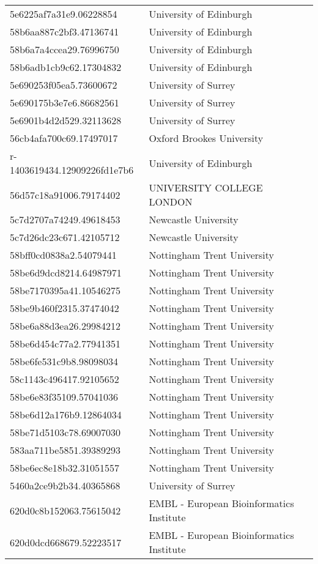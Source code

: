 \begin{tabular}{ll}
5e6225af7a31e9.06228854 & University of Edinburgh \\
58b6aa887c2bf3.47136741 & University of Edinburgh \\
58b6a7a4ccea29.76996750 & University of Edinburgh \\
58b6adb1cb9c62.17304832 & University of Edinburgh \\
5e690253f05ea5.73600672 & University of Surrey \\
5e690175b3e7e6.86682561 & University of Surrey \\
5e6901b4d2d529.32113628 & University of Surrey \\
56cb4afa700c69.17497017 & Oxford Brookes University \\
r-1403619434.12909226fd1e7b6 & University of Edinburgh \\
56d57c18a91006.79174402 & UNIVERSITY COLLEGE LONDON \\
5c7d2707a74249.49618453 & Newcastle University \\
5c7d26dc23c671.42105712 & Newcastle University \\
58bff0cd0838a2.54079441 & Nottingham Trent University \\
58be6d9dcd8214.64987971 & Nottingham Trent University \\
58be7170395a41.10546275 & Nottingham Trent University \\
58be9b460f2315.37474042 & Nottingham Trent University \\
58be6a88d3ea26.29984212 & Nottingham Trent University \\
58be6d454c77a2.77941351 & Nottingham Trent University \\
58be6fe531c9b8.98098034 & Nottingham Trent University \\
58c1143c496417.92105652 & Nottingham Trent University \\
58be6e83f35109.57041036 & Nottingham Trent University \\
58be6d12a176b9.12864034 & Nottingham Trent University \\
58be71d5103c78.69007030 & Nottingham Trent University \\
583aa711be5851.39389293 & Nottingham Trent University \\
58be6ec8e18b32.31051557 & Nottingham Trent University \\
5460a2ce9b2b34.40365868 & University of Surrey \\
620d0c8b152063.75615042 & EMBL - European Bioinformatics Institute \\
620d0dcd668679.52223517 & EMBL - European Bioinformatics Institute \\

\end{tabular}
